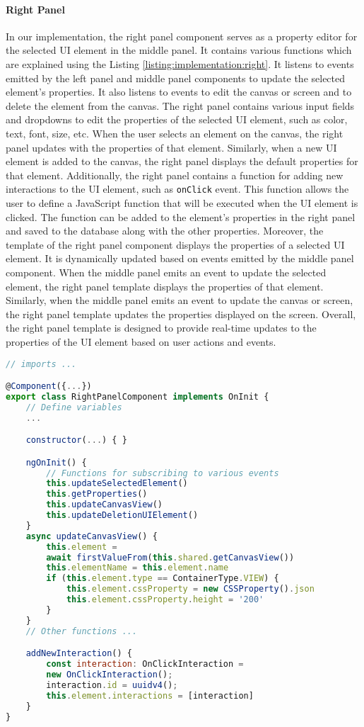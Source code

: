 \paragraph{Right Panel}
In our implementation, the right panel component serves as a property editor for the selected UI element in the middle panel. 
It contains various functions which are explained using the Listing \ref{listing:implementation:right}.
It listens to events emitted by the left panel and middle panel components to update the selected element's properties. 
It also listens to events to edit the canvas or screen and to delete the element from the canvas.
The right panel contains various input fields and dropdowns to edit the properties of the selected UI element, such as color, text, font, size, etc. 
When the user selects an element on the canvas, the right panel updates with the properties of that element. 
Similarly, when a new UI element is added to the canvas, the right panel displays the default properties for that element.
Additionally, the right panel contains a function for adding new interactions to the UI element, such as \texttt{onClick} event. 
This function allows the user to define a JavaScript function that will be executed when the UI element is clicked. 
The function can be added to the element's properties in the right panel and saved to the database along with the other properties.
Moreover, the template of the right panel component displays the properties of a selected UI element. 
It is dynamically updated based on events emitted by the middle panel component. 
When the middle panel emits an event to update the selected element, the right panel template displays the properties of that element. 
Similarly, when the middle panel emits an event to update the canvas or screen, the right panel template updates the properties displayed on the screen. 
Overall, the right panel template is designed to provide real-time updates to the properties of the UI element based on user actions and events.
\clearpage
\begin{lstlisting}[language=JavaScript, caption=The Typescript File for the Right Panel, label=listing:implementation:right]
// imports ...

@Component({...})
export class RightPanelComponent implements OnInit {
    // Define variables
    ...

    constructor(...) { }

    ngOnInit() {
        // Functions for subscribing to various events
        this.updateSelectedElement()
        this.getProperties()
        this.updateCanvasView()
        this.updateDeletionUIElement()
    }
    async updateCanvasView() {
        this.element = 
        await firstValueFrom(this.shared.getCanvasView())
        this.elementName = this.element.name
        if (this.element.type == ContainerType.VIEW) {
            this.element.cssProperty = new CSSProperty().json
            this.element.cssProperty.height = '200'
        }
    }
    // Other functions ...

    addNewInteraction() {
        const interaction: OnClickInteraction = 
        new OnClickInteraction();
        interaction.id = uuidv4();
        this.element.interactions = [interaction]
    }
}    
\end{lstlisting}
\clearpage
